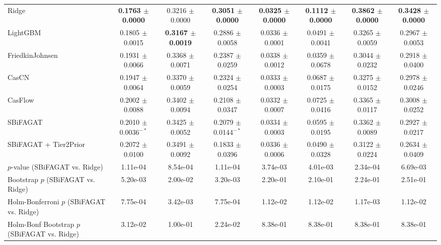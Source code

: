\begin{table}[t]
{\begin{tabular}{lccccccc}
Ridge & \textbf{0.1763 $\pm$ 0.0000} & 0.3216 $\pm$ 0.0000 & \textbf{0.3051 $\pm$ 0.0000} & \textbf{0.0325 $\pm$ 0.0000} & \textbf{0.1112 $\pm$ 0.0000} & \textbf{0.3862 $\pm$ 0.0000} & \textbf{0.3428 $\pm$ 0.0000} \\
LightGBM & 0.1805 $\pm$ 0.0015 & \textbf{0.3167 $\pm$ 0.0019} & 0.2886 $\pm$ 0.0058 & 0.0336 $\pm$ 0.0001 & 0.0491 $\pm$ 0.0041 & 0.3265 $\pm$ 0.0059 & 0.2967 $\pm$ 0.0053 \\
FriedkinJohnsen & 0.1931 $\pm$ 0.0066 & 0.3368 $\pm$ 0.0071 & 0.2387 $\pm$ 0.0259 & 0.0338 $\pm$ 0.0012 & 0.0359 $\pm$ 0.0678 & 0.3044 $\pm$ 0.0232 & 0.2918 $\pm$ 0.0400 \\
CasCN & 0.1947 $\pm$ 0.0064 & 0.3370 $\pm$ 0.0059 & 0.2324 $\pm$ 0.0254 & 0.0333 $\pm$ 0.0003 & 0.0687 $\pm$ 0.0175 & 0.3275 $\pm$ 0.0152 & 0.2978 $\pm$ 0.0246 \\
CasFlow & 0.2002 $\pm$ 0.0088 & 0.3402 $\pm$ 0.0094 & 0.2108 $\pm$ 0.0347 & 0.0332 $\pm$ 0.0007 & 0.0725 $\pm$ 0.0416 & 0.3365 $\pm$ 0.0117 & 0.3008 $\pm$ 0.0252 \\
SBiFAGAT & 0.2010 $\pm$ 0.0036$^{-*}$ & 0.3425 $\pm$ 0.0052 & 0.2079 $\pm$ 0.0144$^{-*}$ & 0.0334 $\pm$ 0.0003 & 0.0595 $\pm$ 0.0195 & 0.3362 $\pm$ 0.0089 & 0.2927 $\pm$ 0.0217 \\
SBiFAGAT + Tier2Prior & 0.2072 $\pm$ 0.0100 & 0.3491 $\pm$ 0.0092 & 0.1833 $\pm$ 0.0396 & 0.0336 $\pm$ 0.0006 & 0.0490 $\pm$ 0.0328 & 0.3122 $\pm$ 0.0224 & 0.2634 $\pm$ 0.0409 \\
\midrule
$p$-value (SBiFAGAT vs. Ridge) & 1.11e-04 & 8.54e-04 & 1.11e-04 & 3.74e-03 & 4.01e-03 & 2.34e-04 & 6.69e-03 \\
Bootstrap $p$ (SBiFAGAT vs. Ridge) & 5.20e-03 & 2.00e-02 & 3.20e-03 & 2.20e-01 & 2.10e-01 & 2.24e-01 & 2.51e-01 \\
Holm-Bonferroni $p$ (SBiFAGAT vs. Ridge) & 7.75e-04 & 3.42e-03 & 7.75e-04 & 1.12e-02 & 1.12e-02 & 1.17e-03 & 1.12e-02 \\
Holm-Bonf Bootstrap $p$ (SBiFAGAT vs. Ridge) & 3.12e-02 & 1.00e-01 & 2.24e-02 & 8.38e-01 & 8.38e-01 & 8.38e-01 & 8.38e-01 \\
\bottomrule
\end{tabular}
}
\end{table}
